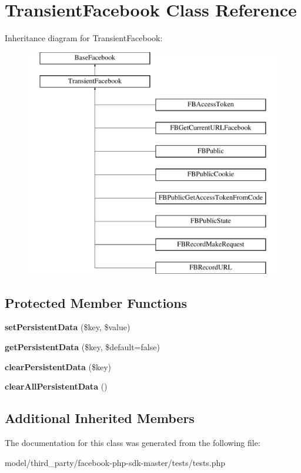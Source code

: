 \hypertarget{classTransientFacebook}{\section{Transient\-Facebook Class Reference}
\label{classTransientFacebook}
}
Inheritance diagram for Transient\-Facebook\-:\begin{figure}[H]
\begin{center}
\leavevmode
\includegraphics[height=10.000000cm]{classTransientFacebook}
\end{center}
\end{figure}
\subsection*{Protected Member Functions}
\begin{DoxyCompactItemize}
\item 
\hypertarget{classTransientFacebook_af59a1c6a33ece992311a1a97b7849805}{{\bfseries set\-Persistent\-Data} (\$key, \$value)}\label{classTransientFacebook_af59a1c6a33ece992311a1a97b7849805}

\item 
\hypertarget{classTransientFacebook_a7b8591652ca1a85f03647acbff9e4382}{{\bfseries get\-Persistent\-Data} (\$key, \$default=false)}\label{classTransientFacebook_a7b8591652ca1a85f03647acbff9e4382}

\item 
\hypertarget{classTransientFacebook_a6bddf7435fc760c097031ff145f1b260}{{\bfseries clear\-Persistent\-Data} (\$key)}\label{classTransientFacebook_a6bddf7435fc760c097031ff145f1b260}

\item 
\hypertarget{classTransientFacebook_a4960fce046dd024daa121c48d84da091}{{\bfseries clear\-All\-Persistent\-Data} ()}\label{classTransientFacebook_a4960fce046dd024daa121c48d84da091}

\end{DoxyCompactItemize}
\subsection*{Additional Inherited Members}


The documentation for this class was generated from the following file\-:\begin{DoxyCompactItemize}
\item 
model/third\-\_\-party/facebook-\/php-\/sdk-\/master/tests/tests.\-php\end{DoxyCompactItemize}
